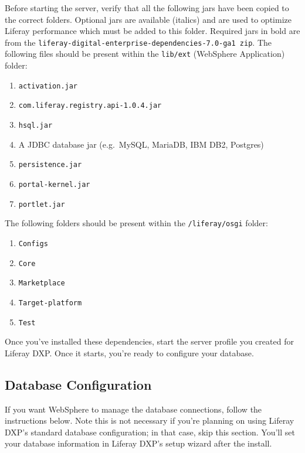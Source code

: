 Before starting the server, verify that all the following jars have been
copied to the correct folders. Optional jars are available (italics) and
are used to optimize Liferay performance which must be added to this
folder. Required jars in bold are from the
\texttt{liferay-digital-enterprise-dependencies-7.0-ga1\ zip}. The
following files should be present within the \texttt{lib/ext} (WebSphere
Application) folder:

\begin{enumerate}
\def\labelenumi{\arabic{enumi}.}
\tightlist
\item
  \texttt{activation.jar}
\item
  \texttt{com.liferay.registry.api-1.0.4.jar}
\item
  \texttt{hsql.jar}
\item
  A JDBC database jar (e.g.~MySQL, MariaDB, IBM DB2, Postgres)
\item
  \texttt{persistence.jar}
\item
  \texttt{portal-kernel.jar}
\item
  \texttt{portlet.jar}
\end{enumerate}

The following folders should be present within the
\texttt{/liferay/osgi} folder:

\begin{enumerate}
\def\labelenumi{\arabic{enumi}.}
\tightlist
\item
  \texttt{Configs}
\item
  \texttt{Core}
\item
  \texttt{Marketplace}
\item
  \texttt{Target-platform}
\item
  \texttt{Test}
\end{enumerate}

Once you've installed these dependencies, start the server profile you
created for Liferay DXP. Once it starts, you're ready to configure your
database.

\subsection{Database Configuration}\label{database-configuration-4}

If you want WebSphere to manage the database connections, follow the
instructions below. Note this is not necessary if you're planning on
using Liferay DXP's standard database configuration; in that case, skip
this section. You'll set your database information in Liferay DXP's
setup wizard after the install.

